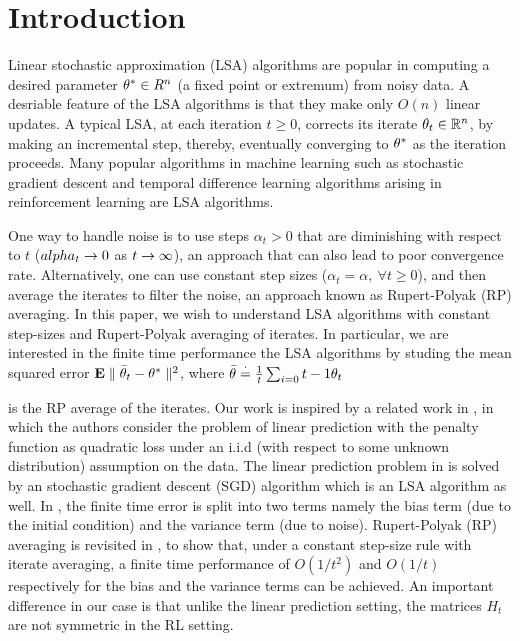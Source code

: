 \section{Introduction}
Linear stochastic approximation (LSA) algorithms are popular in computing a desired parameter $\theta^*\in R^n$ (a fixed point or extremum) from noisy data. A desriable feature of the LSA algorithms is that they make only $O(n)$ linear updates. A typical LSA, at each iteration $t\geq 0$, corrects its iterate $\theta_t\in \mathbb{R}^n$, by making an incremental step, thereby, eventually converging to $\theta^*$ as the iteration proceeds. Many popular algorithms in machine learning such as stochastic gradient descent and temporal difference learning algorithms arising in reinforcement learning are LSA algorithms.\par
One way to handle noise is to use steps $\alpha_t>0$ that are diminishing with respect to $t$ ($alpha_t \rightarrow 0$ as $t\rightarrow\infty$), an approach that can also lead to poor convergence rate. Alternatively, one can use constant step sizes ($\alpha_t=\alpha,~\forall t\geq 0$), and then average the iterates to filter the noise, an approach known as Rupert-Polyak (RP) averaging. In this paper, we wish to understand LSA algorithms with constant step-sizes and Rupert-Polyak averaging of iterates. In particular, we are interested in the finite time performance the LSA algorithms by studing the mean squared error $\mathbf{E}\parallel \bar{\theta}_t-\theta^* \parallel^2$, where $\bar{\theta}\stackrel{\cdot}{=}\frac{1}{t}\sum_{i=0}{t-1}\theta_t$\par is the RP average of the iterates.
Our work is inspired by a related work in \cite{bachaistats}, in which the authors consider the problem of linear prediction with the penalty function as quadratic loss under an i.i.d  (with respect to some unknown distribution) assumption on the data. The linear prediction problem in \cite{bachaistats} is solved by an stochastic gradient descent (SGD) algorithm which is an LSA algorithm as well. In \cite{bachaistats}, the finite time error is split into two terms namely the bias term (due to the initial condition) and the variance term (due to noise). Rupert-Polyak (RP) averaging is revisited in \cite{bachaistats}, to show that, under a constant step-size rule with iterate averaging, a finite time performance of $O(1/t^2)$ and $O(1/t)$ respectively for the bias and the variance terms can be achieved. An important difference in our case is that unlike the linear prediction setting, the matrices $H_t$ are not symmetric in the RL setting.\par
